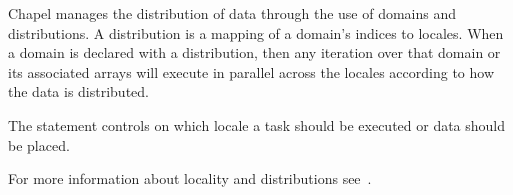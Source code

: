Chapel manages the distribution of data through the use of domains
and distributions.  A distribution is a mapping of a domain's indices to 
locales.  When a domain is declared with a distribution, then any iteration
over that domain or its associated arrays will execute in parallel across the 
locales according to how the data is distributed.

The  statement controls on which locale a task should be
executed or data should be placed.

For more information about locality and distributions 
see~.

